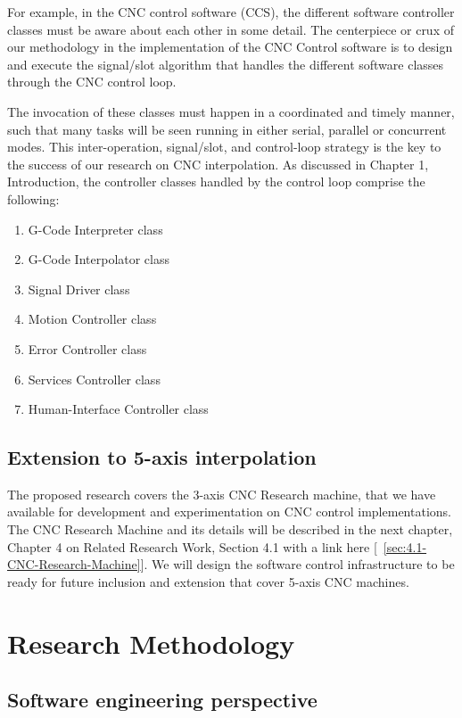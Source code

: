 For example, in the CNC control software (CCS), the different software controller classes must be aware about each other in some detail. The centerpiece or crux of our methodology in the implementation of the CNC Control software is to design and execute the signal/slot algorithm that handles the different software classes through the CNC control loop. 
\vspace{0.5cm}

\pagebreak
The invocation of these classes must happen in a coordinated and timely manner, such that many tasks will be seen running in either serial, parallel or concurrent modes. This inter-operation, signal/slot, and control-loop strategy is the key to the success of our research on CNC interpolation. As discussed in Chapter 1, Introduction, the controller classes handled by the control loop comprise the following:

\begin{enumerate}
	\item G-Code Interpreter class
	\item G-Code Interpolator class
	\item Signal Driver class
	\item Motion Controller class
	\item Error Controller class
	\item Services Controller class
	\item Human-Interface Controller class
\end{enumerate}

\subsection{Extension to 5-axis interpolation}
The proposed research covers the 3-axis CNC Research machine, that we have available for development and experimentation on CNC control implementations. The CNC Research Machine and its details will be described in the next chapter, Chapter 4 on Related Research Work, Section 4.1 with a link here [~\ref{sec:4.1-CNC-Research-Machine}]. We will design the software control infrastructure to be ready for future inclusion and extension that cover 5-axis CNC machines. 

\section{Research Methodology}

\subsection{Software engineering perspective}

